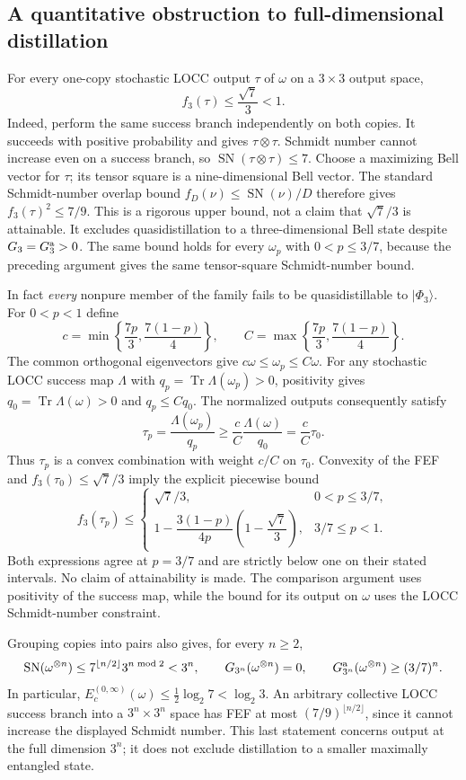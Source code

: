 \subsection{A quantitative obstruction to full-dimensional distillation}

For every one-copy stochastic LOCC output $\tau$ of $\omega$ on a
$3\times3$ output space,
\[
                         f_3(\tau)\le\frac{\sqrt7}{3}<1.
\]
Indeed, perform the same success branch independently on both copies.
It succeeds with positive probability and gives $\tau\otimes\tau$.
Schmidt number cannot increase even on a success branch, so
$\operatorname{SN}(\tau\otimes\tau)\le7$.
Choose a maximizing Bell vector for $\tau$; its tensor square is a
nine-dimensional Bell vector. The standard Schmidt-number overlap bound
$f_D(\nu)\le\operatorname{SN}(\nu)/D$ therefore gives
$f_3(\tau)^2\le7/9$.
This is a rigorous upper bound, not a claim that $\sqrt7/3$ is attainable.
It excludes quasidistillation to a three-dimensional Bell state despite
$G_3=G_3^{\rm a}>0$.
The same bound holds for every $\omega_p$ with $0<p\le3/7$, because the
preceding argument gives the same tensor-square Schmidt-number bound.

In fact \emph{every} nonpure member of the family fails to be
quasidistillable to $|\Phi_3\rangle$. For $0<p<1$ define
\[
 c=\min\left\{\frac{7p}{3},\frac{7(1-p)}4\right\},\qquad
 C=\max\left\{\frac{7p}{3},\frac{7(1-p)}4\right\}.
\]
The common orthogonal eigenvectors give $c\omega\le\omega_p\le C\omega$.
For any stochastic LOCC success map $\Lambda$ with
$q_p=\operatorname{Tr}\Lambda(\omega_p)>0$, positivity gives
$q_0=\operatorname{Tr}\Lambda(\omega)>0$ and $q_p\le Cq_0$.
The normalized outputs consequently satisfy
\[
 \tau_p=\frac{\Lambda(\omega_p)}{q_p}
   \ge\frac cC\frac{\Lambda(\omega)}{q_0}
   =\frac cC\tau_0.
\]
Thus $\tau_p$ is a convex combination with weight $c/C$ on $\tau_0$.
Convexity of the FEF and $f_3(\tau_0)\le\sqrt7/3$ imply the explicit
piecewise bound
\[
 f_3(\tau_p)\le
 \begin{cases}
  \sqrt7/3,&0<p\le3/7,\\[2pt]
  1-\dfrac{3(1-p)}{4p}\left(1-\dfrac{\sqrt7}{3}\right),
       &3/7\le p<1.
 \end{cases}
\]
Both expressions agree at $p=3/7$ and are strictly below one on their
stated intervals. No claim of attainability is made. The comparison
argument uses positivity of the success map, while the bound for its
output on $\omega$ uses the LOCC Schmidt-number constraint.

Grouping copies into pairs also gives, for every $n\ge2$,
\[
 \operatorname{SN}(\omega^{\otimes n})
        \le 7^{\lfloor n/2\rfloor}3^{n\bmod2}<3^n,
 \qquad G_{3^n}(\omega^{\otimes n})=0,
 \qquad G_{3^n}^{\rm a}(\omega^{\otimes n})\ge(3/7)^n.
\]
In particular,
$E_c^{(0,\infty)}(\omega)\le\tfrac12\log_2 7<\log_2 3$.
An arbitrary collective LOCC success branch into a $3^n\times3^n$ space
has FEF at most $(7/9)^{\lfloor n/2\rfloor}$, since it cannot increase
the displayed Schmidt number. This last statement concerns output at the
full dimension $3^n$; it does not exclude distillation to a smaller
maximally entangled state.

